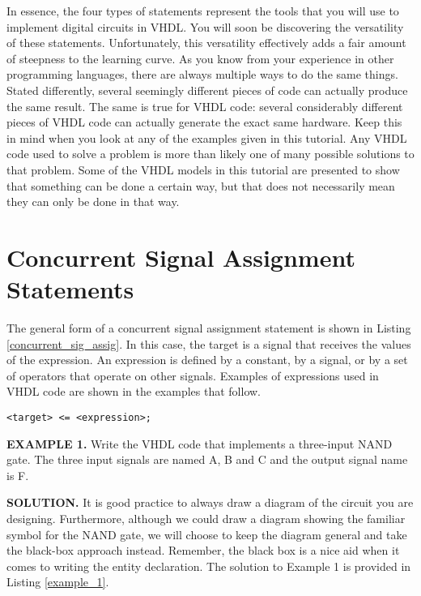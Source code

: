 In essence, the four types of statements represent the tools that you will use to implement digital circuits in VHDL. You will soon be discovering the versatility of these statements. Unfortunately, this versatility effectively adds a fair amount of steepness to the learning curve. As you know from your experience in other programming languages, there are always multiple ways to do the same things. Stated differently, several seemingly different pieces of code can actually produce the same result. The same is true for VHDL code: several considerably different pieces of VHDL code can actually generate the exact same hardware. Keep this in mind when you look at any of the examples given in this tutorial. Any VHDL code used to solve a problem is more than likely one of many possible solutions to that problem. Some of the VHDL models in this tutorial are presented to show that something can be done a certain way, but that does not necessarily mean they can only be done in that way.

\section{Concurrent Signal Assignment Statements}
The general form of a concurrent signal assignment statement is shown in Listing \ref{concurrent_sig_assig}. In this case, the target is a signal that receives the values of the expression. An expression is defined by a constant, by a signal, or by a set of operators that operate on other signals. Examples of expressions used in VHDL code are shown in the examples that follow.

\noindent
\begin{minipage}{0.99\linewidth}
\begin{lstlisting}[label=concurrent_sig_assig, caption=Syntax for the concurrent signal assignment statement.]
<target> <= <expression>;
\end{lstlisting}
\end{minipage}

\begin{leftbar}
\noindent
\textbf{EXAMPLE 1.}
Write the VHDL code that implements a three-input NAND gate. The three input signals are named A, B and C and the output signal name is F. 
\end{leftbar}
\noindent
\textbf{SOLUTION.} It is good practice to always draw a diagram of the circuit you are designing. Furthermore, although we could draw a diagram showing the familiar symbol for the NAND gate, we will choose to keep the diagram general and take the black-box approach instead. Remember, the black box is a nice aid when it comes to writing the entity declaration. The solution to Example 1 is provided in Listing \ref{example_1}.

